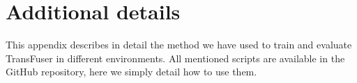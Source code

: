 \chapter{Additional details}
\label{app:instructions}

This appendix describes in detail the method we have used to train and evaluate TransFuser in different environments.
All mentioned scripts are available in the GitHub repository,
here we simply detail how to use them.




